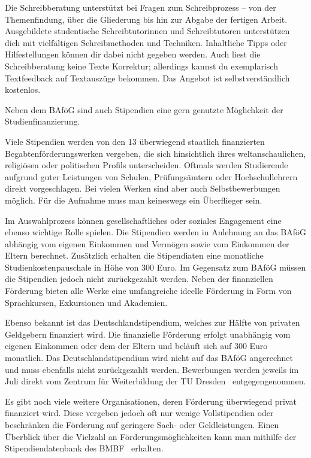 Die Schreibberatung unterstützt bei Fragen zum Schreibprozess -- von der Themenfindung, über die Gliederung bis hin zur Abgabe der fertigen Arbeit.
Ausgebildete studentische Schreibtutorinnen und Schreibtutoren unterstützen dich mit vielfältigen Schreibmethoden und Techniken.
Inhaltliche Tipps oder Hilfestellungen können dir dabei nicht gegeben werden.
Auch liest die Schreibberatung keine Texte Korrektur; allerdings kannst du exemplarisch Textfeedback auf Textauszüge bekommen.
Das Angebot ist selbstverständlich kostenlos.


Neben dem BAföG sind auch Stipendien eine gern genutzte Möglichkeit der Studienfinanzierung.

Viele Stipendien werden von den 13 überwiegend staatlich finanzierten Begabtenförderungswerken vergeben, die sich hinsichtlich ihres weltanschaulichen, religiösen oder politischen Profils unterscheiden.
Oftmals werden Studierende aufgrund guter Leistungen von Schulen, Prüfungsämtern oder Hochschullehrern direkt vorgeschlagen.
Bei vielen Werken sind aber auch Selbstbewerbungen möglich.
Für die Aufnahme muss man keineswegs ein Überflieger sein.

Im Auswahlprozess können gesellschaftliches oder soziales Engagement eine ebenso wichtige Rolle spielen.
Die Stipendien werden in Anlehnung an das BAföG abhängig vom eigenen Einkommen und Vermögen sowie vom Einkommen der Eltern berechnet.
Zusätzlich erhalten die Stipendiaten eine monatliche Studienkostenpauschale in Höhe von 300 Euro.
Im Gegensatz zum BAföG müssen die Stipendien jedoch nicht zurückgezahlt werden.
Neben der finanziellen Förderung bieten alle Werke eine umfangreiche ideelle Förderung in Form von Sprachkursen, Exkursionen und Akademien.

Ebenso bekannt ist das Deutschlandstipendium, welches zur Hälfte von privaten Geldgebern finanziert wird.
Die finanzielle Förderung erfolgt unabhängig vom eigenen Einkommen oder dem der Eltern und beläuft sich auf 300 Euro monatlich.
Das Deutschlandstipendium wird nicht auf das BAföG angerechnet und muss ebenfalls nicht zurückgezahlt werden.
Bewerbungen werden jeweils im Juli direkt vom Zentrum für Weiterbildung der TU Dresden~ entgegengenommen.

Es gibt noch viele weitere Organisationen, deren Förderung überwiegend privat finanziert wird. Diese vergeben jedoch oft nur wenige Vollstipendien oder beschränken die Förderung auf geringere Sach- oder Geldleistungen.
Einen Überblick über die Vielzahl an Förderungsmöglichkeiten kann man mithilfe der Stipendiendatenbank des BMBF~ erhalten.

